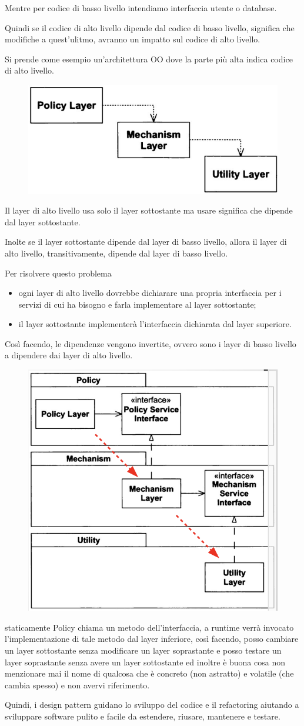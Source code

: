 Mentre per codice di basso livello intendiamo interfaccia utente o database.

Quindi se il codice di alto livello dipende dal codice di basso livello, significa che modifiche a quest'ulitmo, avranno un impatto sul codice di alto livello.

\newpage
Si prende come esempio un'architettura OO dove la parte più alta indica codice di alto livello.
\begin{figure}
  \includegraphics[width=0.5\linewidth]{../../immagini/principio_SOLID/architetturaOOnoDIP}  
\end{figure}

Il layer di alto livello usa solo il layer sottostante ma usare significa che dipende dal layer sottostante.

Inolte se il layer sottostante dipende dal layer di basso livello, allora il layer di alto livello, transitivamente, dipende dal layer di basso livello.

Per risolvere questo problema
\begin{itemize}
  \item ogni layer di alto livello dovrebbe dichiarare una propria interfaccia per i servizi di cui ha bisogno e farla implementare al layer sottostante;
  \item il layer sottostante implementerà l'interfaccia dichiarata dal layer superiore.
\end{itemize}

Così facendo, le dipendenze vengono invertite, ovvero sono i layer di basso livello a dipendere dai layer di alto livello.
\begin{figure}[H]
  \centering
  \includegraphics[width=0.35\linewidth]{../../immagini/principio_SOLID/architetturaOODIP}  
\end{figure}

staticamente Policy chiama un metodo dell'interfaccia, a runtime verrà invocato l'implementazione di tale metodo dal layer inferiore, così facendo, posso cambiare un
layer sottostante senza modificare un layer soprastante e posso testare un layer soprastante senza avere un layer sottostante ed inoltre è buona cosa non menzionare 
mai il nome di qualcosa che è concreto (non astratto) e volatile (che cambia spesso) e non avervi riferimento.

Quindi, i design pattern guidano lo sviluppo del codice e il refactoring aiutando a sviluppare software pulito e facile da estendere, riusare, mantenere e testare.